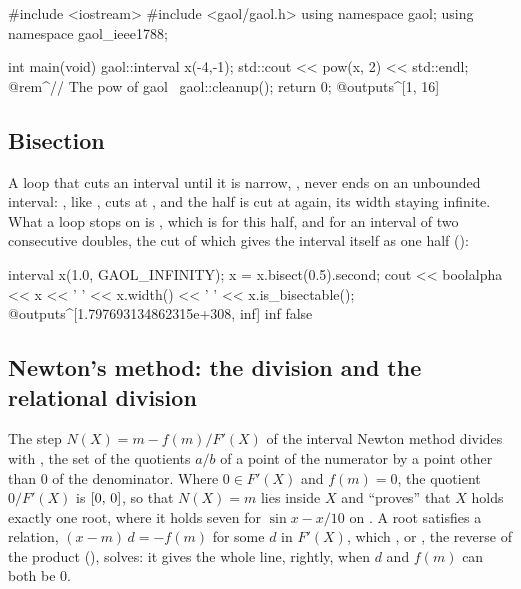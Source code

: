 \documentclass[12pt,a4paper,twoside,openright]{book}
\begin{document}
\begin{example}
#include <iostream>
#include <gaol/gaol.h>
using namespace gaol;
using namespace gaol_ieee1788;

int main(void)
{
  gaol::interval x(-4,-1);
  std::cout << pow(x, 2) << std::endl; @rem^// The pow of gaol~
  gaol::cleanup();
  return 0;
}
@outputs^[1, 16]~
\end{example}

\subsection{Bisection}
%

A loop that cuts an interval until it is narrow,
, never ends on an unbounded interval:
, like , cuts  at
, and the half  is cut at
 again, its width staying infinite. What a loop stops on is
, which is  for this half, and for an
interval of two consecutive doubles, the cut of which gives the interval
itself as one half ():\newinvfive

\begin{example}
interval x(1.0, GAOL_INFINITY);
x = x.bisect(0.5).second;
cout << boolalpha << x << ' ' << x.width() << ' '
     << x.is_bisectable();
@outputs^[1.797693134862315e+308, inf] inf false~
\end{example}

\subsection{Newton's method: the division and the relational division}
%

The step $N(X)=m-f(m)/F'(X)$ of the interval Newton method divides with
\code{/}, the set of the quotients $a/b$ of a point of the numerator by a point
other than 0 of the denominator. Where $0\in F'(X)$ and $f(m)=0$, the quotient
$0/F'(X)$ is $[0,\,0]$, so that $N(X)=m$ lies inside $X$ and ``proves''
that $X$ holds exactly one root, where it holds seven for $\sin x-x/10$ on
. A root satisfies a relation, $(x-m)\,d=-f(m)$ for some $d$ in
$F'(X)$, which \code{\%}, or , the reverse of the product
(), solves: it gives the whole line, rightly,
when $d$ and $f(m)$ can both be 0.
\end{document}
